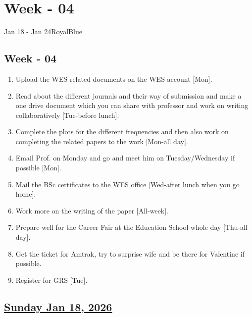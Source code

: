\section{Week - 04}
\begin{physicsmodule}{Jan 18 - Jan 24}{RoyalBlue}
  \begin{lawbox}
    \subsection*{\sffamily\bfseries Week - 04}
    \begin{enumerate}
    \item Upload the WES related documents on the WES account [Mon].\cmark
    \item Read about the different journals and their way of submission and make a one drive document which you can share with professor and work on writing collaboratively [Tue-before lunch].
    \item Complete the plots for the different frequencies and then also work on completing the related papers to the work [Mon-all day].\cmark
    \item Email Prof. on Monday and go and meet him on Tuesday/Wednesday if possible [Mon]. \cmark
     \item Mail the BSc certificates to the WES office [Wed-after lunch when you go home].
    \item Work more on the writing of the paper [All-week]. 
    \item Prepare well for the Career Fair at the Education School whole day [Thu-all day].    
    \item Get the ticket for Amtrak, try to surprise wife and be there for Valentine if possible.
    \item Register for GRS [Tue].
\end{enumerate}
  \end{lawbox}
\end{physicsmodule}
\subsection*{\underline{Sunday Jan 18, 2026}}
